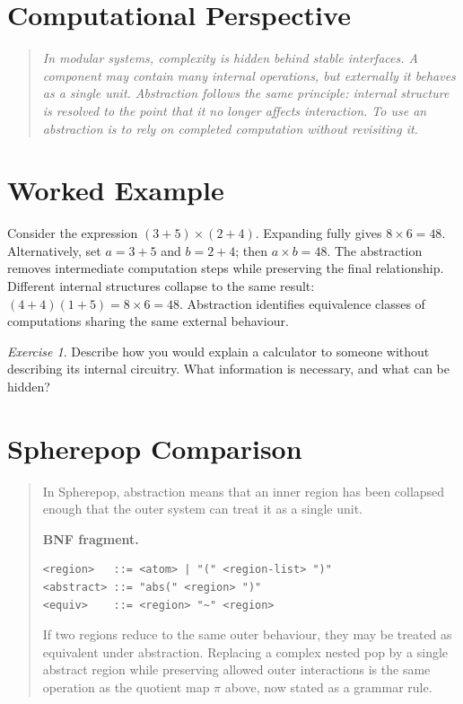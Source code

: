 \documentclass[11pt]{book}
\theoremstyle{plain}
\theoremstyle{definition}
\theoremstyle{remark}
\newtheorem{exercise}[theorem]{Exercise}
\newenvironment{computationalaside}
  {\begin{quote}\small\itshape}
  {\end{quote}}
\newenvironment{spherepopcomparison}
  {\begin{quote}\small}
  {\end{quote}}
\begin{document}
\section*{Computational Perspective}
\begin{computationalaside}
In modular systems, complexity is hidden behind stable interfaces. A
component may contain many internal operations, but externally it behaves
as a single unit. Abstraction follows the same principle: internal
structure is resolved to the point that it no longer affects interaction.
To use an abstraction is to rely on completed computation without
revisiting it.
\end{computationalaside}

\section*{Worked Example}
Consider the expression $(3 + 5) \times (2 + 4)$. Expanding fully gives
$8 \times 6 = 48$. Alternatively, set $a = 3 + 5$ and $b = 2 + 4$; then
$a \times b = 48$. The abstraction removes intermediate computation steps
while preserving the final relationship. Different internal structures
collapse to the same result: $(4 + 4)(1 + 5) = 8 \times 6 = 48$.
Abstraction identifies equivalence classes of computations sharing the
same external behaviour.

\begin{exercise}
Describe how you would explain a calculator to someone without describing
its internal circuitry. What information is necessary, and what can be
hidden?
\end{exercise}

\section*{Spherepop Comparison}
\begin{spherepopcomparison}
In Spherepop, abstraction means that an inner region has been collapsed
enough that the outer system can treat it as a single unit.

\textbf{BNF fragment.}
\begin{verbatim}
<region>   ::= <atom> | "(" <region-list> ")"
<abstract> ::= "abs(" <region> ")"
<equiv>    ::= <region> "~" <region>
\end{verbatim}

If two regions reduce to the same outer behaviour, they may be treated as
equivalent under abstraction. Replacing a complex nested pop by a single
abstract region while preserving allowed outer interactions is the same
operation as the quotient map $\pi$ above, now stated as a grammar rule.
\end{spherepopcomparison}
\end{document}
